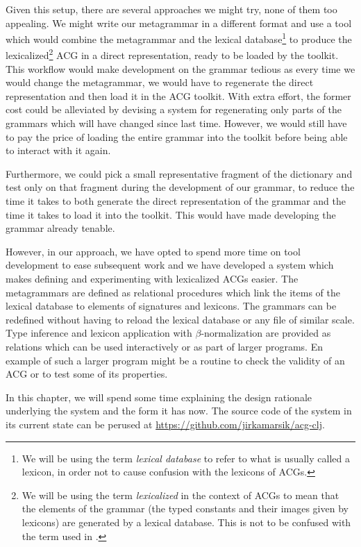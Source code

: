 Given this setup, there are several approaches we might try, none of
them too appealing. We might write our metagrammar in a different format
and use a tool which would combine the metagrammar and the lexical
database\footnote{We will be using the term \emph{lexical database} to
  refer to what is usually called a lexicon, in order not to cause
  confusion with the lexicons of ACGs.} to produce the
lexicalized\footnote{We will be using the term \emph{lexicalized} in the
  context of ACGs to mean that the elements of the grammar (the typed
  constants and their images given by lexicons) are generated by a
  lexical database. This is not to be confused with the term used in
  \cite{yoshinaka2005complexity}.} ACG in a direct representation, ready
to be loaded by the toolkit. This workflow would make development on the
grammar tedious as every time we would change the metagrammar, we would
have to regenerate the direct representation and then load it in the ACG
toolkit. With extra effort, the former cost could be alleviated by
devising a system for regenerating only parts of the grammars which will
have changed since last time. However, we would still have to pay the
price of loading the entire grammar into the toolkit before being able
to interact with it again.

Furthermore, we could pick a small representative fragment of the
dictionary and test only on that fragment during the development of our
grammar, to reduce the time it takes to both generate the direct
representation of the grammar and the time it takes to load it into the
toolkit. This would have made developing the grammar already tenable.

However, in our approach, we have opted to spend more time on tool
development to ease subsequent work and we have developed a system which
makes defining and experimenting with lexicalized ACGs easier. The
metagrammars are defined as relational procedures which link the items
of the lexical database to elements of signatures and lexicons. The
grammars can be redefined without having to reload the lexical database
or any file of similar scale. Type inference and lexicon application
with $\beta$-normalization are provided as relations which can be used
interactively or as part of larger programs. En example of such a larger
program might be a routine to check the validity of an ACG or to test
some of its properties.

In this chapter, we will spend some time explaining the design rationale
underlying the system and the form it has now. The source code of the
system in its current state can be perused at
\url{https://github.com/jirkamarsik/acg-clj}.


